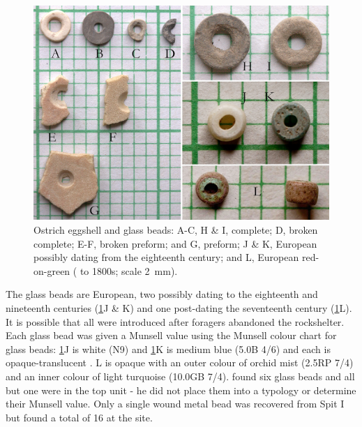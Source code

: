  	\begin{figure} %
 		\includegraphics[width=\linewidth]{figures/Forssman-Figure10}
 		\caption{Ostrich eggshell and glass beads: A-C, H \& I, complete; D, broken complete; E-F, broken preform; and G, preform; J \& K, European possibly dating from the eighteenth century; and L, European red-on-green ( to 1800s; scale \SI{2}{\milli\meter}).}
 		\label{fig:Forssman-Figure10}
 	\end{figure}
 
 
 The glass beads are European, two possibly dating to the eighteenth and nineteenth centuries (\cref{fig:Forssman-Figure10}J \& K) 
 and one post-dating the seventeenth century (\cref{fig:Forssman-Figure10}L). 
 It is possible that all were introduced after foragers abandoned the rockshelter. 
 Each glass bead was given a Munsell value using the Munsell colour chart for glass beads: 
 \cref{fig:Forssman-Figure10}J is white (N9) and \cref{fig:Forssman-Figure10}K is medium blue (5.0B 4/6) 
 and each is opaque-translucent 
 \parencite[slight glow of light along edges;][70]{Wood_2011}. 
 L is opaque with an outer colour of orchid mist (2.5RP 7/4) and an inner colour of light turquoise (10.0GB 7/4).  
 \textcite{Walker_1994} found six glass beads and all but one were in the top unit - he did not place them into a typology or determine their Munsell value. 
 Only a single wound metal bead was recovered from Spit I but \textcite{Walker_1994} found a total of 16 at the site.


